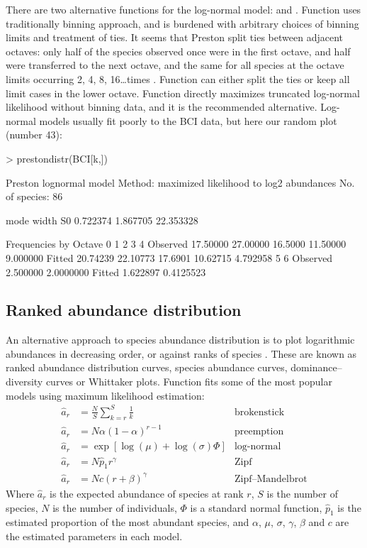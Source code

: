 \documentclass[a4paper,10pt,twocolumn]{article}
\begin{document}
There are two alternative functions for the log-normal model:
 and .  Function 
uses traditionally binning approach, and is burdened with arbitrary
choices of binning limits and treatment of ties. It seems that Preston
split ties between adjacent octaves: only half of the species observed
once were in the first octave, and half were transferred to the next
octave, and the same for all species at the octave limits occurring 2,
4, 8, 16\ldots times \citep{WilliamsonGaston05}. Function
 can either split the ties or keep all limit cases in
the lower octave.  Function  directly maximizes
truncated log-normal likelihood without binning data, and it is the
recommended alternative.  Log-normal models usually fit poorly to the
BCI data, but here our random plot (number 43):
\begin{Schunk}
\begin{Sinput}
> prestondistr(BCI[k,])
\end{Sinput}
\begin{Soutput}
Preston lognormal model
Method: maximized likelihood to log2 abundances 
No. of species: 86 

     mode     width        S0 
 0.722374  1.867705 22.353328 

Frequencies by Octave
                0        1       2        3        4
Observed 17.50000 27.00000 16.5000 11.50000 9.000000
Fitted   20.74239 22.10773 17.6901 10.62715 4.792958
                5         6
Observed 2.500000 2.0000000
Fitted   1.622897 0.4125523
\end{Soutput}
\end{Schunk}

\subsection{Ranked abundance distribution}

An alternative approach to species abundance distribution is to plot
logarithmic abundances in decreasing order, or against ranks of
species \citep{Whittaker65}.  These are known as ranked abundance
distribution curves, species abundance curves, dominance--diversity
curves or Whittaker plots.  Function  fits some of the
most popular models \citep{Bastow91} using maximum likelihood
estimation:
\begin{align}
\hat a_r &= \frac{N}{S} \sum_{k=r}^S \frac{1}{k} &\text{brokenstick}\\
\hat a_r &= N \alpha (1-\alpha)^{r-1} & \text{preemption} \\
\hat a_r &= \exp \left[\log (\mu) + \log (\sigma) \Phi \right]
&\text{log-normal}\\
\hat a_r &= N \hat p_1 r^\gamma &\text{Zipf}\\
\hat a_r &= N c (r + \beta)^\gamma &\text{Zipf--Mandelbrot}
\end{align}
Where $\hat a_r$ is the expected abundance of species at rank $r$, $S$
is the number of species, $N$ is the number of individuals, $\Phi$ is
a standard normal function, $\hat p_1$ is the estimated proportion of
the most abundant species, and $\alpha$, $\mu$, $\sigma$, $\gamma$,
$\beta$ and $c$ are the estimated parameters in each model.
\end{document}
